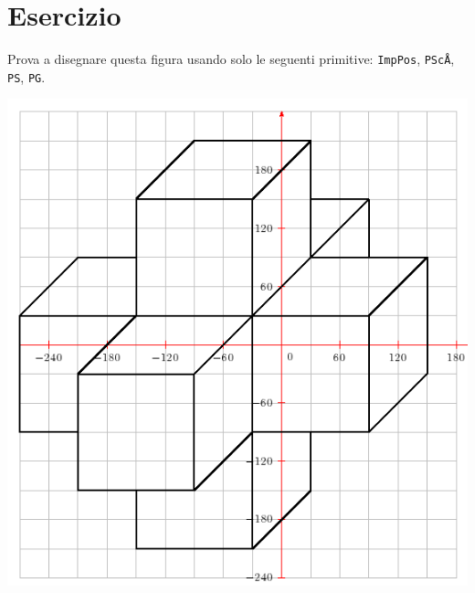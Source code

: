\section{Esercizio}
Prova a disegnare questa figura usando solo le seguenti primitive: \texttt{ImpPos}, \texttt{PScÅ}, \texttt{PS}, \texttt{PG}.\\
\begin{center}
	\includegraphics[scale=0.7]{pics/fpos-cube.png}
\end{center}